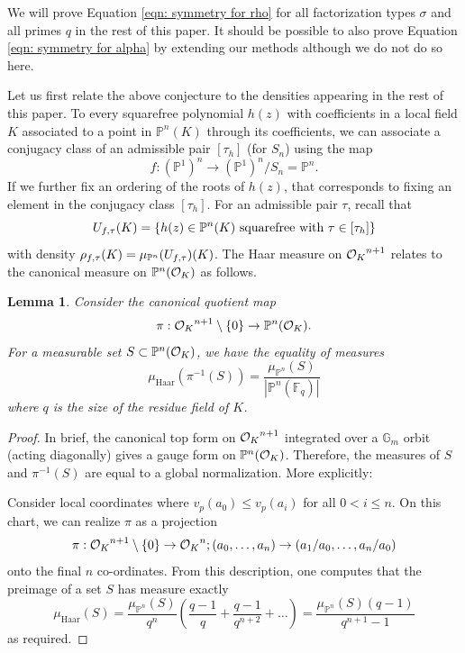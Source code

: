 \documentclass[10pt]{article}
\theoremstyle{plain}
\newtheorem{lemma}[theorem]{Lemma}
\theoremstyle{definition}
\numberwithin{equation}{section}
\begin{document}
We will prove Equation \ref{eqn: symmetry for rho} for all factorization types $\sigma$ and all primes $q$ in the rest of this paper. It should be possible to also prove Equation \ref{eqn: symmetry for alpha} by extending our methods although we do not do so here.

Let us first relate the above conjecture to the densities appearing in the rest of this paper. To every squarefree polynomial $h(z)$ with coefficients in a local field $K$ associated to a point in $\mathbb P^n(K)$ through its coefficients, we can associate a conjugacy class of an admissible pair $[\tau_h]$ (for $S_n$) using the map 
\[f: (\mathbb P^1)^n \to (\mathbb P^1)^n/S_n = \mathbb P^n.\]
If we further fix an ordering of the roots of $h(z)$, that corresponds to fixing an element in the conjugacy class $[\tau_h]$. For an admissible pair $\tau$, recall that
\[U_{f,\tau}(K) = \{h(z) \in \mathbb P^n(K) \text{ squarefree with } \tau \in [\tau_h]\}\]
with density $\rho_{f,\tau}(K) = \mu_{\mathbb P^n}(U_{f,\tau})(K)$. The Haar measure on ${{\mathcal O}_{K}}^{n+1}$ relates to the canonical measure on $\mathbb P^n({{\mathcal O}_{K}})$ as follows.

\begin{lemma}\label{lemma: bhargava densities to our densities}
Consider the canonical quotient map
\[\pi: {{\mathcal O}_{K}}^{n+1} \setminus \{0\} \to \mathbb P^n({{\mathcal O}_{K}}).\]
For a measurable set $S \subset \mathbb P^n({{\mathcal O}_{K}})$, we have the equality of measures
\[\mu_{\mathrm{Haar}}(\pi^{-1}(S)) = \frac{\mu_{\mathbb P^n}(S)}{|\mathbb P^n(\mathbb F_q)|}\]
where $q$ is the size of the residue field of $K$.
\end{lemma}
\begin{proof}
In brief, the canonical top form on ${{\mathcal O}_{K}}^{n+1}$ integrated over a $\mathbb G_m$ orbit (acting diagonally) gives a gauge form on $\mathbb P^n({{\mathcal O}_{K}})$. Therefore, the measures of $S$ and $\pi^{-1}(S)$ are equal to a global normalization. More explicitly:

Consider local coordinates where $v_p(a_0) \leq v_p(a_i)$ for all $0 < i \leq n$. On this chart, we can realize $\pi$ as a projection 
\[\pi: {{\mathcal O}_{K}}^{n+1} \setminus \{0\} \to { {\mathcal O} _{K}}^n; (a_0,\dots,a_n) \to (a_1/a_0,\dots,a_n/a_0)\]
onto the final $n$ co-ordinates. From this description, one computes that the preimage of a set $S$ has measure exactly
\[\mu_{\mathrm{Haar}}(S) = \frac{\mu_{\mathbb P^n}(S)}{q^{n}}\left(\frac{q-1}{q} + \frac{q-1}{q^{n+2}} + \dots\right) = \frac{\mu_{\mathbb P^n}(S)(q-1)}{q^{n+1}-1}\]
as required.
\end{proof}
\end{document}
